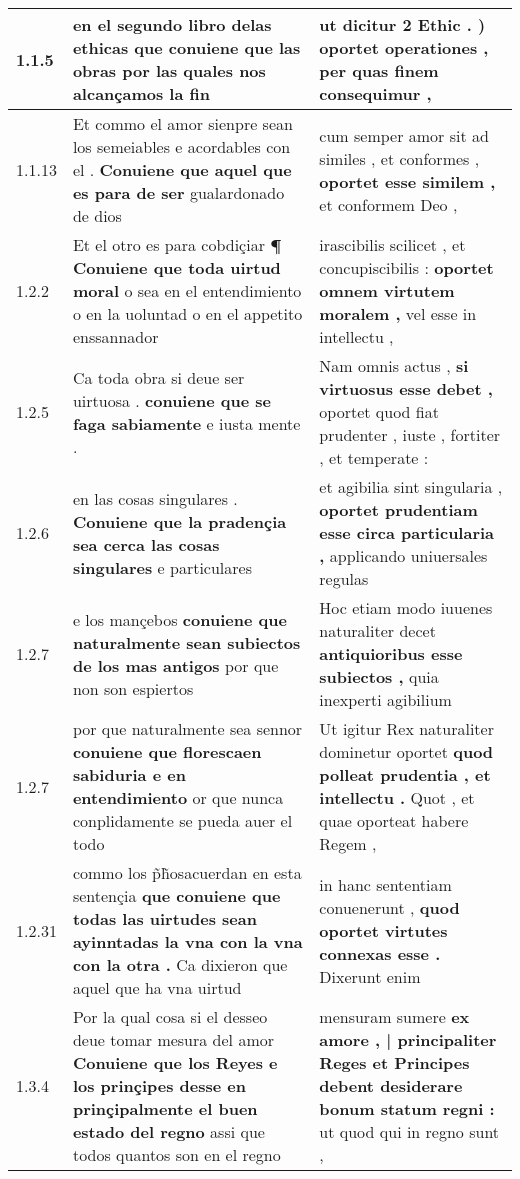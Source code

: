 \begin{tabular}{|p{1cm}|p{6.5cm}|p{6.5cm}|}

\hline
1.1.5 & en el segundo libro delas ethicas \textbf{ que conuiene que las obras } por las quales nos alcançamos la fin & ut dicitur 2 Ethic . ) \textbf{ oportet operationes , } per quas finem consequimur , \\\hline
1.1.13 & Et commo el amor sienpre sean los semeiables e acordables con el . \textbf{ Conuiene que aquel que es para de ser } gualardonado de dios & cum semper amor sit ad similes , et conformes , \textbf{ oportet esse similem , } et conformem Deo , \\\hline
1.2.2 & Et el otro es para cobdiçiar \textbf{ ¶ Conuiene que toda uirtud moral } o sea en el entendimiento o en la uoluntad o en el appetito enssannador & irascibilis scilicet , et concupiscibilis : \textbf{ oportet omnem virtutem moralem , } vel esse in intellectu , \\\hline
1.2.5 & Ca toda obra si deue ser uirtuosa . \textbf{ conuiene que se faga sabiamente } e iusta mente . & Nam omnis actus , \textbf{ si virtuosus esse debet , } oportet quod fiat prudenter , iuste , fortiter , et temperate : \\\hline
1.2.6 & en las cosas singulares . \textbf{ Conuiene que la pradençia sea cerca las cosas singulares } e particulares & et agibilia sint singularia , \textbf{ oportet prudentiam esse circa particularia , } applicando uniuersales regulas \\\hline
1.2.7 & e los mançebos \textbf{ conuiene que naturalmente sean subiectos de los mas antigos } por que non son espiertos & Hoc etiam modo iuuenes naturaliter decet \textbf{ antiquioribus esse subiectos , } quia inexperti agibilium \\\hline
1.2.7 & por que naturalmente sea sennor \textbf{ conuiene que florescaen sabiduria e en entendimiento } or que nunca conplidamente se pueda auer el todo & Ut igitur Rex naturaliter dominetur oportet \textbf{ quod polleat prudentia , et intellectu . } Quot , et quae oporteat habere Regem , \\\hline
1.2.31 & commo los p̃h̃osacuerdan en esta sentençia \textbf{ que conuiene que todas las uirtudes sean ayinntadas la vna con la vna con la otra . } Ca dixieron que aquel que ha vna uirtud & in hanc sententiam conuenerunt , \textbf{ quod oportet virtutes connexas esse . } Dixerunt enim \\\hline
1.3.4 & Por la qual cosa si el desseo deue tomar mesura del amor \textbf{ Conuiene que los Reyes e los prinçipes desse en prinçipalmente el buen estado del regno } assi que todos quantos son en el regno & mensuram sumere \textbf{ ex amore , | principaliter Reges et Principes debent desiderare bonum statum regni : } ut quod qui in regno sunt , \\\hline

\end{tabular}
